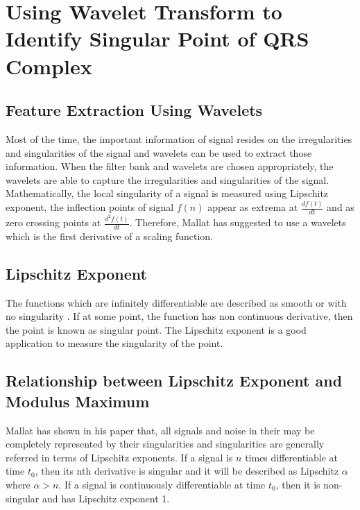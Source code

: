 \section{Using Wavelet Transform to Identify Singular Point of QRS Complex}

\subsection{Feature Extraction Using Wavelets}
Most of the time, the important information of signal resides on the irregularities and singularities of the signal and wavelets can be used to extract those information. When the filter bank and wavelets are chosen appropriately, the wavelets are able to capture the irregularities and singularities of the signal. Mathematically, the local singularity of a signal is measured using Lipschitz exponent, the inflection points of signal $f(n)$ appear as extrema at $\frac{df(t)}{dt}$ and as zero crossing points at $\frac{d^2f(t)}{dt}$. Therefore, Mallat has suggested to use a wavelets which is the first derivative of a scaling function.

\subsection{Lipschitz Exponent}
The functions which are infinitely differentiable are described as smooth or with no singularity \cite{xing2013unifying}. If at some point, the function has non continuous derivative, then the point is known as singular point. The Lipschitz exponent is a good application to measure the singularity of the point.

\subsection{Relationship between Lipschitz Exponent and Modulus Maximum}
Mallat has shown in his paper \cite{119727} that, all signals and noise in their may be completely represented by their singularities and singularities are generally referred in terms of Lipschitz exponents. If a signal is $n$ times differentiable at time $t_0$, then its nth derivative is singular and it will be described as Lipschitz $\alpha$ where $\alpha > n$. If a signal is continuously differentiable at time $t_0$, then it is non-singular and has Lipschitz exponent 1.


